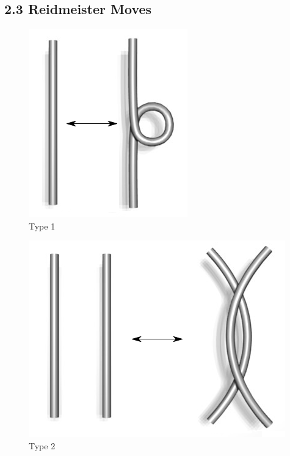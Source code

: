 \documentclass[executivepaper]{article}
\begin{document}
\pagebreak

\vspace*{-30mm}

\subsection*{2.3 Reidmeister Moves}

\begin{figure}[H]

\centering

\includegraphics[scale=0.5]{Reidemeister_move_1.png}

\caption{Type 1}

\end{figure}

\vspace{2mm}

\begin{figure}[H]

\centering

\includegraphics[scale=0.5]{Reidemeister_move_2.png}

\caption{Type 2}

\end{figure}
\end{document}
